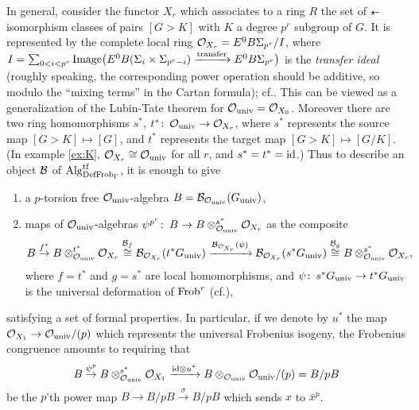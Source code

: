 \documentclass{gtpart}
\theoremstyle{definition}
\theoremstyle{remark}
\def\co{\colon\thinspace}
\newcommand{\Alg}{{\rm Alg}}
\newcommand{\Frob}{{\rm Frob}}
\newcommand{\CO}{{\cal O}}
\newcommand{\DF}{{{\rm DefFrob}_\Gamma}}
\newcommand{\cff}[2]{cf.\thinspace{\cite[#1]{#2}}}
\begin{document}
In general, consider the functor $X_r$ which associates to a ring $R$ the set 
of $\star$-isomorphism classes of pairs $[G > K]$ with $K$ a degree $p^r$ 
subgroup of $G$.  It is represented by the complete local ring $\CO_{X_r} = 
E^0 B\Sigma_{p^r}/I$, where $I = \sum_{0<i<p^r} 
{\rm Image}\big(E^0 B(\Sigma_i\times\Sigma_{p^r-i}) 
\xrightarrow{\rm transfer} E^0 B\Sigma_{p^r}\big)$ is the {\em transfer 
ideal} (roughly speaking, the corresponding power operation should be 
additive, so modulo the ``mixing terms'' in the Cartan formula); 
\cff{theorem 9.2}{strickland}.  This can be viewed as a generalization of the 
Lubin-Tate theorem for $\CO_{\rm univ} = \CO_{X_0}$.  Moreover there are two 
ring homomorphisms $s^*$, $t^*\co \CO_{\rm univ} \to \CO_{X_r}$, where $s^*$ 
represents the source map $[G > K] \mapsto [G]$, and $t^*$ represents the 
target map $[G > K] \mapsto [G/K]$.  (In example \ref{ex:K}, $\CO_{X_r} \cong 
\CO_{\rm univ}$ for all $r$, and $s^* = t^* = {\rm id}$.)  Thus to describe an 
object ${\cal B}$ of $\Alg_\DF^{\rm tf}$, it is enough to give 
\begin{enumerate}
 \item a $p$-torsion free $\CO_{\rm univ}$-algebra 
 $B = {\cal B}_{\CO_{\rm univ}}(G_{\rm univ})$, 
 \item maps of $\CO_{\rm univ}$-algebras 
 $\psi^{p^r}\co B \to B \otimes_{\CO_{\rm univ}}^{s^*} \CO_{X_r}$ as the 
 composite 
 \[
  B \stackrel{f^*}{\to} B \otimes_{\CO_{\rm univ}}^{t^*} \CO_{X_r} 
  \stackrel{{\cal B}_f}{\cong} {\cal B}_{\CO_{X_r}} (t^*G_{\rm univ}) 
  \xrightarrow{{\cal B}_{\CO_{X_r}} (\psi)} 
  {\cal B}_{\CO_{X_r}} (s^*G_{\rm univ}) 
  \stackrel{{\cal B}_g}{\cong} B \otimes_{\CO_{\rm univ}}^{s^*} \CO_{X_r}, 
 \]
 where $f = t^*$ and $g = s^*$ are local homomorphisms, and 
 $\psi\co s^*G_{\rm univ} \to t^*G_{\rm univ}$ is the universal deformation of 
 $\Frob^r$ (\cff{section 13}{strick}), 
\end{enumerate}
satisfying a set of formal properties.  In particular, if we denote by $u^*$ 
the map $\CO_{X_1} \to \CO_{\rm univ}/(p)$ which represents the universal 
Frobenius isogeny, the Frobenius congruence amounts to requiring that 
\[
 B \stackrel{\psi^p}{\to} B \otimes_{\CO_{\rm univ}}^{s^*} \CO_{X_1} 
 \xrightarrow{{\rm id} \otimes u^*} 
 B \otimes_{\CO_{\rm univ}} \CO_{\rm univ}/(p) = B/pB 
\]
be the $p$'th power map $B \to B/pB \stackrel{\sigma}{\to} B/pB$ which sends 
$x$ to $\bar{x}^p$.  
\end{document}
